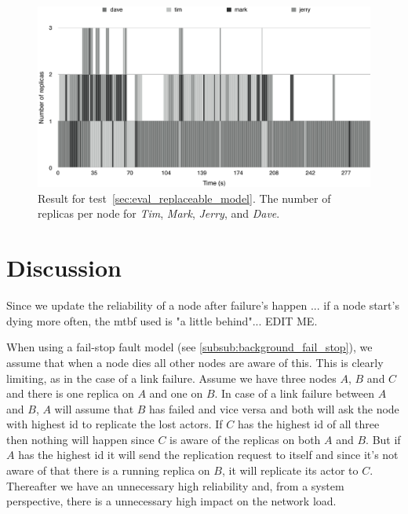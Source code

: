 \documentclass{cslthse-msc}
\begin{document}
\begin{figure}[!hbt]
\centering
\includegraphics[scale=0.5]{images/results/loads/unloaded.pdf}
\caption{Result for test~\ref{sec:eval_replaceable_model}. The number of replicas per node for \emph{Tim}, \emph{Mark}, \emph{Jerry}, and \emph{Dave}.} \label{fig:eval_replaceable_model_unloaded}
\end{figure}

\chapter{Discussion} \label{ch:discussion}
Since we update the reliability of a node after failure's happen ... if a node start's dying more often, the mtbf used is "a little behind"... EDIT ME.

When using a fail-stop fault model (see \cref{subsub:background_fail_stop}), we assume that when a node dies all other nodes are aware of this. This is clearly limiting, as in the case of a link failure. Assume we have three nodes $A$, $B$ and $C$ and there is one replica on $A$ and one on $B$. In case of a link failure between $A$ and $B$, $A$ will assume that $B$ has failed and vice versa and both will ask the node with highest id to replicate the lost actors. If $C$ has the highest id of all three then nothing will happen since $C$ is aware of the replicas on both $A$ and $B$. But if $A$ has the highest id it will send the replication request to itself and since it's not aware of that there is a running replica on $B$, it will replicate its actor to $C$. Thereafter we have an unnecessary high reliability and, from a system perspective, there is a unnecessary high impact on the network load.
\end{document}
